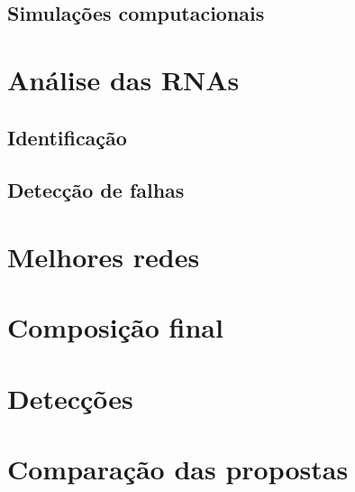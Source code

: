 \subsection{Simulações computacionais}


\section{Análise das RNAs}

\subsection{Identificação}

\subsection{Detecção de falhas}

\section{Melhores redes}

\section{Composição final}

\section{Detecções}

\section{Comparação das propostas}
